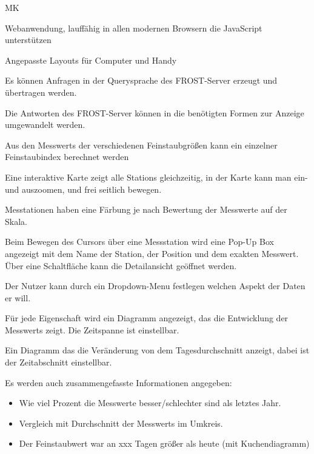 \begin{Kriterien}{MK}

	\item Webanwendung, lauffähig in allen modernen Browsern die JavaScript unterstützen

	\item Angepasste Layouts für Computer und \gls{Handy}
	
	\item Es können Anfragen in der Querysprache des \gls{FROST-Server} erzeugt und übertragen werden.
	
	\item Die Antworten des \gls{FROST-Server} können in die benötigten Formen zur Anzeige umgewandelt werden.
	
	\item Aus den \glspl{Messwert} der verschiedenen Feinstaubgrößen kann ein einzelner \gls{Feinstaubindex} berechnet werden

	\item Eine interaktive Karte zeigt alle \glspl{Station} gleichzeitig, in der Karte kann man ein- und auszoomen, und frei seitlich bewegen.

	\item Messtationen haben eine Färbung je nach Bewertung der Messwerte auf der Skala.
	
	\item Beim Bewegen des Cursors über eine Messstation wird eine \gls{Pop-Up} Box angezeigt mit dem Name der Station, der Position und dem exakten Messwert.
		Über eine Schaltfläche kann die Detailansicht geöffnet werden.
	
	\item Der Nutzer kann durch ein \gls{Dropdown-Menu} festlegen welchen Aspekt der Daten er will. 
	
	\item Für jede Eigenschaft wird ein Diagramm angezeigt, das die Entwicklung der \glspl{Messwert} zeigt. Die Zeitspanne ist einstellbar.
	
	\item Ein Diagramm das die Veränderung von dem Tagesdurchschnitt anzeigt, dabei ist der Zeitabschnitt einstellbar.
	
	\item Es werden auch zusammengefasste Informationen angegeben: 
\end{Kriterien}
		
\begin{itemize}
	\item Wie viel Prozent die Messwerte besser/schlechter sind als letztes Jahr.
    \item Vergleich mit Durchschnitt der \glspl{Messwert} im Umkreis.
    \item Der Feinstaubwert war an xxx Tagen größer als heute (mit \gls{Kuchendiagramm})
\end{itemize}

